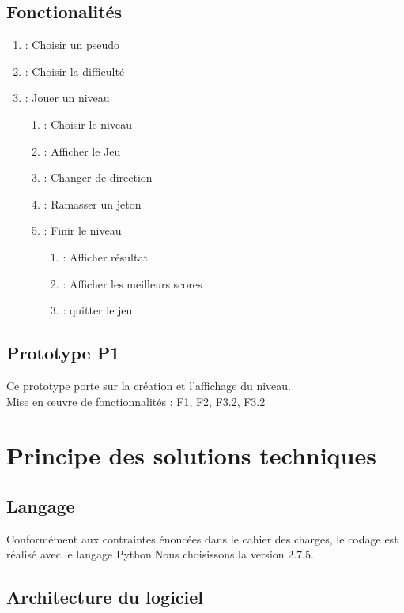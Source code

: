 \documentclass[a4paper,11pt]{article}
\begin{document}
\subsection{Fonctionalités}

\begin{enumerate}[label*= F\arabic*,font = \textbf]
	\item : Choisir un pseudo
	\item : Choisir la difficulté
	\item : Jouer un niveau
	\begin{enumerate}[label*=.\arabic*,font = \textbf]
		\item : Choisir le niveau
		\item : Afficher le Jeu
		\item : Changer de direction
		\item : Ramasser un jeton
		\item : Finir le niveau
		\begin{enumerate}[label*=.\arabic*,font = \textbf]
			\item : Afficher résultat
			\item : Afficher les meilleurs scores
			\item : quitter le jeu
		\end{enumerate}
	\end{enumerate}
\end{enumerate}

\subsection{Prototype P1}

Ce prototype porte sur la création et l'affichage du niveau.\\
Mise en œuvre de fonctionnalités : F1, F2, F3.2, F3.2

\section{Principe des solutions techniques}

\subsection{Langage}

Conformément aux contraintes énoncées dans le cahier des charges, le codage est réalisé avec le langage Python.Nous choisissons la version 2.7.5.

\subsection{Architecture du logiciel}
\end{document}
